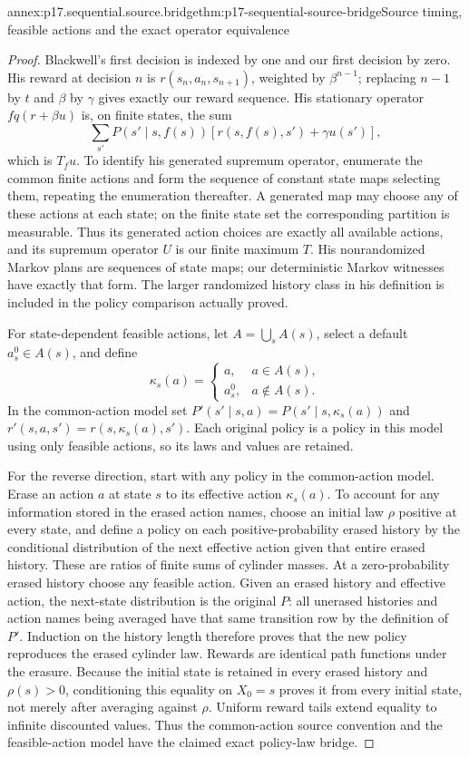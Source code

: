 \begin{annexitem}{annex:p17.sequential.source.bridge}{thm:p17-sequential-source-bridge}{Source timing, feasible actions and the exact operator equivalence}
\begin{proof}
Blackwell's first decision is indexed by
one and our first decision by zero.
His reward at decision \(n\) is
\(r(s_n,a_n,s_{n+1})\), weighted by
\(\beta^{n-1}\); replacing \(n-1\) by
\(t\) and \(\beta\) by \(\gamma\)
gives exactly our reward sequence.
His stationary operator \(fq(r+\beta u)\)
is, on finite states, the sum
\[
        \sum_{s'}P(s'\mid s,f(s))
                      [r(s,f(s),s')+\gamma u(s')],
\]
which is \(T_fu\).
To identify his generated supremum
operator, enumerate the common finite
actions and form the sequence of
constant state maps selecting them,
repeating the enumeration thereafter.
A generated map may choose any of
these actions at each state; on the
finite state set the corresponding
partition is measurable.
Thus its generated action choices
are exactly all available actions,
and its supremum operator \(U\)
is our finite maximum \(T\).
His nonrandomized Markov plans are
sequences of state maps; our deterministic
Markov witnesses have exactly that form.
The larger randomized history class
in his definition is included in
the policy comparison actually proved.

For state-dependent feasible actions,
let \(A=\bigcup_sA(s)\), select a default
\(a_s^0\in A(s)\), and define
\[
 \kappa_s(a)=
 \begin{cases}a,&a\in A(s),\\a_s^0,&a\notin A(s).\end{cases}
\]
In the common-action model set
\(P'(s'\mid s,a)=P(s'\mid s,\kappa_s(a))\)
and
\(r'(s,a,s')=r(s,\kappa_s(a),s')\).
Each original policy is a policy in this
model using only feasible actions, so
its laws and values are retained.

For the reverse direction, start with
any policy in the common-action model.
Erase an action \(a\) at state \(s\)
to its effective action \(\kappa_s(a)\).
To account for any information stored
in the erased action names, choose an
initial law \(\rho\) positive at every
state, and define a policy on each
positive-probability erased history
by the conditional distribution of the
next effective action given that entire
erased history. These are ratios of
finite sums of cylinder masses. At a
zero-probability erased history choose
any feasible action.
Given an erased history and effective
action, the next-state distribution
is the original \(P\): all unerased
histories and action names being
averaged have that same transition
row by the definition of \(P'\).
Induction on the history length
therefore proves that the new policy
reproduces the erased cylinder law.
Rewards are identical path functions
under the erasure. Because the initial
state is retained in every erased
history and \(\rho(s)>0\), conditioning
this equality on \(X_0=s\) proves it
from every initial state, not merely
after averaging against \(\rho\).
Uniform reward tails extend equality
to infinite discounted values.
Thus the common-action source convention
and the feasible-action model have
the claimed exact policy-law bridge.


\end{proof}
\end{annexitem}
